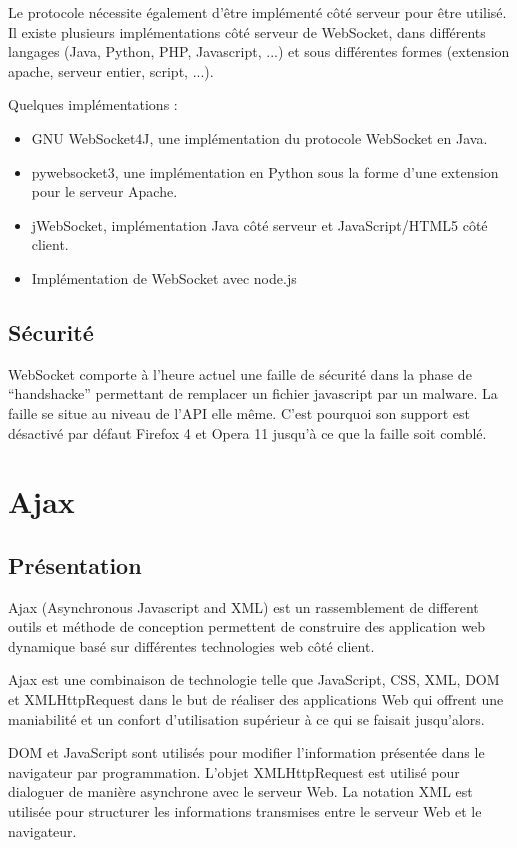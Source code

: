 \documentclass[a4paper,10pt]{report}
\begin{document}
Le protocole nécessite également d'être implémenté côté serveur pour être 
utilisé. Il existe plusieurs implémentations côté serveur de WebSocket, 
dans différents langages (Java, Python, PHP, Javascript, ...) et sous 
différentes formes (extension apache, serveur entier, script, ...).


Quelques implémentations :
\begin{itemize}
  \item GNU WebSocket4J, une implémentation du protocole WebSocket en Java. 
  \item pywebsocket3, une implémentation en Python sous la forme d'une extension pour le serveur  Apache.
  \item jWebSocket, implémentation Java côté serveur et JavaScript/HTML5 côté client.
  \item Implémentation de WebSocket avec node.js
\end{itemize}


    \subsection{Sécurité}

WebSocket comporte à l'heure actuel une faille de sécurité dans la phase 
de ``handshacke'' permettant de remplacer un fichier javascript par un malware. 
La faille se situe au niveau de l'API elle même. C'est pourquoi son support 
est désactivé par défaut Firefox 4 et Opera 11 jusqu'à ce que la faille 
soit comblé.


  \section{Ajax}

    \subsection{Présentation}

Ajax (Asynchronous Javascript and XML) est un rassemblement de different outils 
et méthode de conception permettent de construire des application web dynamique 
basé sur différentes technologies web côté client.

Ajax est une combinaison de technologie telle que JavaScript, CSS, XML, DOM et 
XMLHttpRequest dans le but de réaliser des applications Web qui offrent une 
maniabilité et un confort d'utilisation supérieur à ce qui se faisait jusqu'alors.

DOM et JavaScript sont utilisés pour modifier l'information présentée dans le navigateur 
par programmation. L'objet XMLHttpRequest est utilisé pour dialoguer de manière 
asynchrone avec le serveur Web. La notation XML est utilisée pour structurer les 
informations transmises entre le serveur Web et le navigateur.
\end{document}

